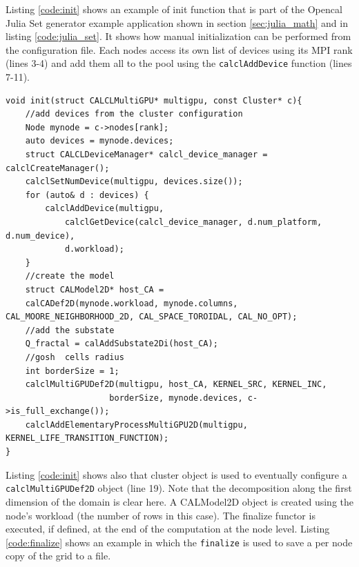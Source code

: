 Listing \ref{code:init} shows an example of init function that is part of the Opencal Julia Set generator example application shown in section \ref{sec:julia_math} and in listing \ref{code:julia_set}. It shows how manual initialization can be performed from the configuration file. Each nodes access its own list of devices using its MPI rank (lines 3-4)  and add them all to the pool using the \texttt{calclAddDevice} function (lines 7-11).
\begin{lstlisting}
void init(struct CALCLMultiGPU* multigpu, const Cluster* c){
    //add devices from the cluster configuration
    Node mynode = c->nodes[rank];
    auto devices = mynode.devices;
    struct CALCLDeviceManager* calcl_device_manager = calclCreateManager();
    calclSetNumDevice(multigpu, devices.size());
    for (auto& d : devices) {
        calclAddDevice(multigpu, 
            calclGetDevice(calcl_device_manager, d.num_platform, d.num_device),
            d.workload);
    }
    //create the model    
    struct CALModel2D* host_CA =
    calCADef2D(mynode.workload, mynode.columns, CAL_MOORE_NEIGHBORHOOD_2D, CAL_SPACE_TOROIDAL, CAL_NO_OPT);
    //add the substate
    Q_fractal = calAddSubstate2Di(host_CA);
    //gosh  cells radius
    int borderSize = 1;
    calclMultiGPUDef2D(multigpu, host_CA, KERNEL_SRC, KERNEL_INC,
                     borderSize, mynode.devices, c->is_full_exchange());
    calclAddElementaryProcessMultiGPU2D(multigpu,     KERNEL_LIFE_TRANSITION_FUNCTION);
}
\end{lstlisting}
Listing \ref{code:init} shows also that cluster object is used to eventually configure a \texttt{calclMultiGPUDef2D} object (line 19). 
Note that the decomposition along the first dimension of the domain is clear here. A CALModel2D object is created using the node's workload (the number of rows in this case). The finalize functor is executed, if defined, at the end of the computation at the node level. Listing \ref{code:finalize} shows an example in which the \texttt{finalize} is used to save a per node copy of the grid to a file.
